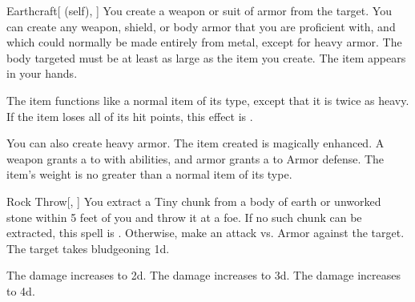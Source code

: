 \lowercase{\hypertarget{spell:Earthcraft}{}}\label{spell:Earthcraft}
\begin{attuneability}[Rank 1]{\hypertarget{spell:Earthcraft}{Earthcraft}}[ (self), ]
You create a weapon or suit of armor from the target.
You can create any weapon, shield, or body armor that you are proficient with, and which could normally be made entirely from metal, except for heavy armor.
The body targeted must be at least as large as the item you create.
The item appears in your hands.

The item functions like a normal item of its type, except that it is twice as heavy.
If the item loses all of its hit points, this effect is .

\rankline
{} You can also create heavy armor.
 The item created is magically enhanced.
A weapon grants a   to  with  abilities,
and armor grants a   to Armor defense.
 The item's weight is no greater than a normal item of its type.
\end{attuneability}
\vspace{0.25em}



\lowercase{\hypertarget{spell:Rock Throw}{}}\label{spell:Rock Throw}
\begin{freeability}[Rank 1]{\hypertarget{spell:Rock Throw}{Rock Throw}}[, ]
You extract a Tiny chunk from a body of earth or unworked stone within 5 feet of you and throw it at a foe.
If no such chunk can be extracted, this spell is .
Otherwise, make an attack vs. Armor against the target.
\hit The target takes bludgeoning  \plus1d.

\rankline
{} The damage increases to  \plus2d.
 The damage increases to  \plus3d.
 The damage increases to  \plus4d.
\end{freeability}
\vspace{0.25em}



